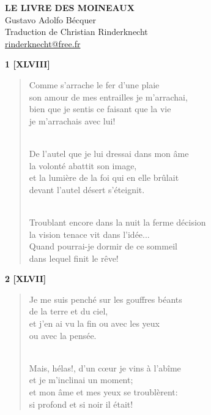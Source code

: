 \documentclass[a4paper,11pt]{book}
\begin{document}
\thispagestyle{empty}
\vspace*{70mm}
\begin{center}
{\Huge\textbf{LE LIVRE DES MOINEAUX}} \\
\vspace*{10mm}
{\Large Gustavo Adolfo Bécquer} \\
\vspace*{10mm}
Traduction de Christian Rinderknecht\\
\url{rinderknecht@free.fr}
\end{center}

\cleardoublepage


\begin{center} {\bf 1 [XLVIII]} \end{center}

\begin{verse}
Comme s'arrache le fer d'une plaie \\
son amour de mes entrailles je m'arrachai, \\
bien que je sentis ce faisant que la vie \\
je m'arrachais avec lui! \\ \

De l'autel que je lui dressai dans mon âme \\
la volonté abattit son image, \\
et la lumière de la foi qui en elle brûlait \\
devant l'autel désert s'éteignit. \\ \

Troublant encore dans la nuit la ferme décision \\
la vision tenace vit dans l'idée... \\
Quand pourrai-je dormir de ce sommeil \\
dans lequel finit le rêve! \\
\end{verse}

\bigskip

\begin{center} {\bf 2 [XLVII]} \end{center}

\begin{verse}
Je me suis penché sur les gouffres béants\\
de la terre et du ciel, \\
et j'en ai vu la fin ou avec les yeux \\
ou avec la pensée. \\ \

Mais, hélas!, d'un c{\oe}ur je vins à l'abîme \\
et je m'inclinai un moment; \\
et mon âme et mes yeux se troublèrent: \\
si profond et si noir il était! \\
\end{verse}
\end{document}
